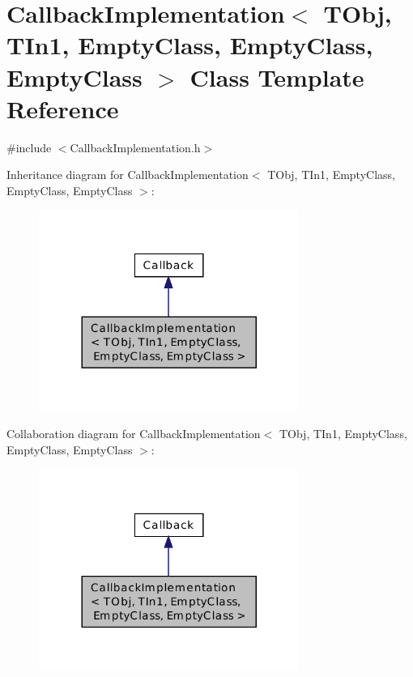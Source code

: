 \hypertarget{class_callback_implementation_3_01_t_obj_00_01_t_in1_00_01_empty_class_00_01_empty_class_00_01_empty_class_01_4}{\section{Callback\-Implementation$<$ T\-Obj, T\-In1, Empty\-Class, Empty\-Class, Empty\-Class $>$ Class Template Reference}
\label{class_callback_implementation_3_01_t_obj_00_01_t_in1_00_01_empty_class_00_01_empty_class_00_01_empty_class_01_4}
}


{\ttfamily \#include $<$Callback\-Implementation.\-h$>$}



Inheritance diagram for Callback\-Implementation$<$ T\-Obj, T\-In1, Empty\-Class, Empty\-Class, Empty\-Class $>$\-:\nopagebreak
\begin{figure}[H]
\begin{center}
\leavevmode
\includegraphics[width=240pt]{class_callback_implementation_3_01_t_obj_00_01_t_in1_00_01_empty_class_00_01_empty_class_00_01_empty_class_01_4__inherit__graph}
\end{center}
\end{figure}


Collaboration diagram for Callback\-Implementation$<$ T\-Obj, T\-In1, Empty\-Class, Empty\-Class, Empty\-Class $>$\-:\nopagebreak
\begin{figure}[H]
\begin{center}
\leavevmode
\includegraphics[width=240pt]{class_callback_implementation_3_01_t_obj_00_01_t_in1_00_01_empty_class_00_01_empty_class_00_01_empty_class_01_4__coll__graph}
\end{center}
\end{figure}

